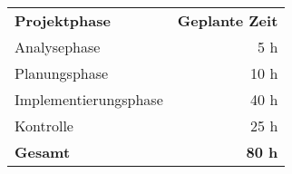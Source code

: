 \begin{tabular}{lr}
\rowcolor{heading}\textbf{Projektphase} & \textbf{Geplante Zeit} \\
Analysephase & 5 h \\
\rowcolor{odd}Planungsphase & 10 h \\
Implementierungsphase & 40 h \\
\rowcolor{odd}Kontrolle & 25 h \\
\hline
\hline
\rowcolor{odd}\textbf{Gesamt} & \textbf{80 h} \\
\end{tabular}
